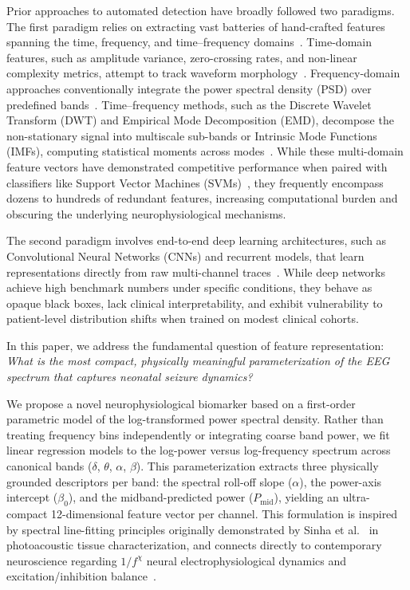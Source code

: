 \documentclass[10pt,twocolumn,letterpaper]{article}
\begin{document}
Prior approaches to automated detection have broadly followed two paradigms. The first paradigm relies on extracting vast batteries of hand-crafted features spanning the time, frequency, and time--frequency domains~\cite{greene2008,temko2011}. Time-domain features, such as amplitude variance, zero-crossing rates, and non-linear complexity metrics, attempt to track waveform morphology~\cite{greene2008}. Frequency-domain approaches conventionally integrate the power spectral density (PSD) over predefined bands~\cite{temko2011}. Time--frequency methods, such as the Discrete Wavelet Transform (DWT) and Empirical Mode Decomposition (EMD), decompose the non-stationary signal into multiscale sub-bands or Intrinsic Mode Functions (IMFs), computing statistical moments across modes~\cite{adeli2003,subasi2007,huang1998,pan2024}. While these multi-domain feature vectors have demonstrated competitive performance when paired with classifiers like Support Vector Machines (SVMs)~\cite{temko2011}, they frequently encompass dozens to hundreds of redundant features, increasing computational burden and obscuring the underlying neurophysiological mechanisms.

The second paradigm involves end-to-end deep learning architectures, such as Convolutional Neural Networks (CNNs) and recurrent models, that learn representations directly from raw multi-channel traces~\cite{ansari2019,oshea2020,kashefiamiri2025}. While deep networks achieve high benchmark numbers under specific conditions, they behave as opaque black boxes, lack clinical interpretability, and exhibit vulnerability to patient-level distribution shifts when trained on modest clinical cohorts.

In this paper, we address the fundamental question of feature representation: \textit{What is the most compact, physically meaningful parameterization of the EEG spectrum that captures neonatal seizure dynamics?} 

We propose a novel neurophysiological biomarker based on a first-order parametric model of the log-transformed power spectral density. Rather than treating frequency bins independently or integrating coarse band power, we fit linear regression models to the log-power versus log-frequency spectrum across canonical bands ($\delta$, $\theta$, $\alpha$, $\beta$). This parameterization extracts three physically grounded descriptors per band: the spectral roll-off slope ($\alpha$), the power-axis intercept ($\beta_0$), and the midband-predicted power ($P_{\text{mid}}$), yielding an ultra-compact 12-dimensional feature vector per channel. This formulation is inspired by spectral line-fitting principles originally demonstrated by Sinha et al.~\cite{sinha2016} in photoacoustic tissue characterization, and connects directly to contemporary neuroscience regarding $1/f^\chi$ neural electrophysiological dynamics and excitation/inhibition balance~\cite{donoghue2020,gao2017,voytek2015}.
\end{document}
